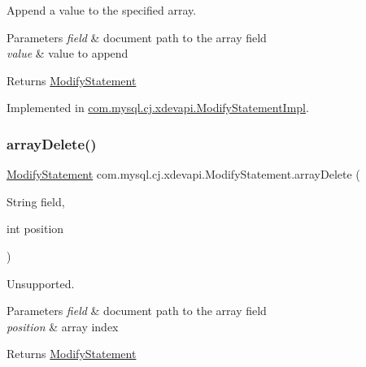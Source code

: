 Append a value to the specified array.


\begin{DoxyParams}{Parameters}
{\em field} & document path to the array field \\
\hline
{\em value} & value to append \\
\hline
\end{DoxyParams}
\begin{DoxyReturn}{Returns}
\mbox{\hyperlink{interfacecom_1_1mysql_1_1cj_1_1xdevapi_1_1_modify_statement}{Modify\+Statement}} 
\end{DoxyReturn}


Implemented in \mbox{\hyperlink{classcom_1_1mysql_1_1cj_1_1xdevapi_1_1_modify_statement_impl_afca543cf08b9d3ad6177c9e6dfde63bd}{com.\+mysql.\+cj.\+xdevapi.\+Modify\+Statement\+Impl}}.

\mbox{\label{interfacecom_1_1mysql_1_1cj_1_1xdevapi_1_1_modify_statement_ab65173595a82dfa001a5217896e73cfc}} 
\subsubsection{\texorpdfstring{array\+Delete()}{arrayDelete()}}
{\footnotesize\ttfamily \mbox{\hyperlink{interfacecom_1_1mysql_1_1cj_1_1xdevapi_1_1_modify_statement}{Modify\+Statement}} com.\+mysql.\+cj.\+xdevapi.\+Modify\+Statement.\+array\+Delete (\begin{DoxyParamCaption}\item[{String}]{field,  }\item[{int}]{position }\end{DoxyParamCaption})}

Unsupported.


\begin{DoxyParams}{Parameters}
{\em field} & document path to the array field \\
\hline
{\em position} & array index \\
\hline
\end{DoxyParams}
\begin{DoxyReturn}{Returns}
\mbox{\hyperlink{interfacecom_1_1mysql_1_1cj_1_1xdevapi_1_1_modify_statement}{Modify\+Statement}} 
\end{DoxyReturn}


